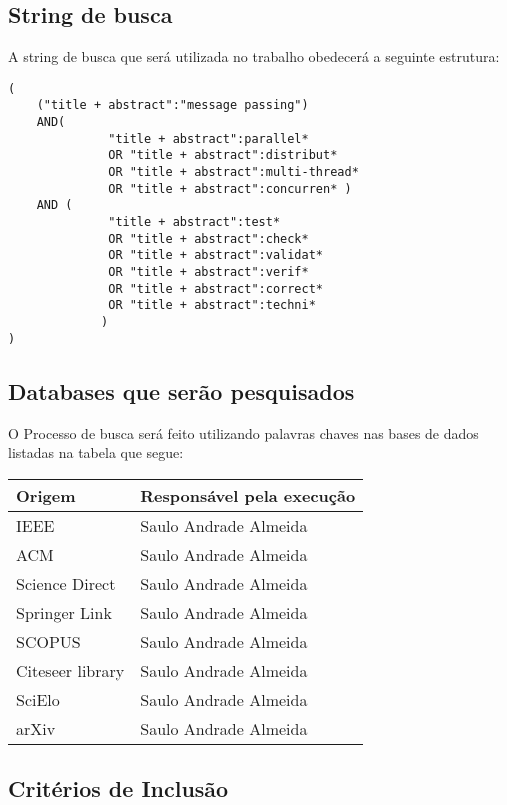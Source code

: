\subsection{String de busca}

A string de busca que será utilizada no trabalho obedecerá a seguinte estrutura:


\begin{verbatim}
(
    ("title + abstract":"message passing")  
    AND(
              "title + abstract":parallel*
              OR "title + abstract":distribut*
              OR "title + abstract":multi-thread*
              OR "title + abstract":concurren* ) 
    AND (
              "title + abstract":test* 
              OR "title + abstract":check*
              OR "title + abstract":validat* 
              OR "title + abstract":verif*
              OR "title + abstract":correct*
              OR "title + abstract":techni*
             )
)    
\end{verbatim}

\subsection{Databases que serão pesquisados}  \label{subsec:repositoriosPesquisa}

O Processo de busca será feito utilizando palavras chaves nas bases de dados listadas na tabela que segue:

\begin{center}
\begin{tabular}{ |p{4cm}|p{7cm}|  }
\hline
\textbf{Origem} & \textbf{Responsável pela execução} \\
\hline
IEEE & Saulo Andrade Almeida \\ 
\hline
ACM & Saulo Andrade Almeida \\ 
\hline
Science Direct & Saulo Andrade Almeida \\ 
\hline
Springer Link & Saulo Andrade Almeida \\ 
\hline
SCOPUS & Saulo Andrade Almeida \\ 
\hline
Citeseer library & Saulo Andrade Almeida \\ 
\hline
SciElo & Saulo Andrade Almeida \\ 
\hline
arXiv & Saulo Andrade Almeida \\ 
\hline
\end{tabular}
\end{center}


\subsection{Critérios de Inclusão}

